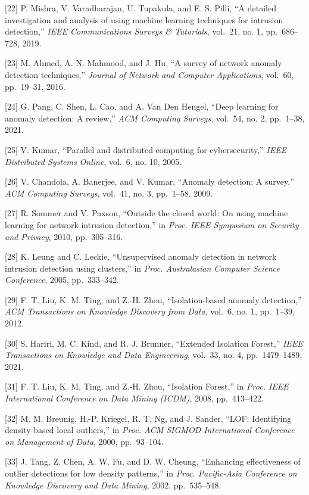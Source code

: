 \documentclass[
  a4paper]{report}
\begin{document}
{[}22{]} P. Mishra, V. Varadharajan, U. Tupakula, and E. S. Pilli, ``A
detailed investigation and analysis of using machine learning techniques
for intrusion detection,'' \emph{IEEE Communications Surveys \&
Tutorials}, vol.~21, no. 1, pp.~686--728, 2019.

{[}23{]} M. Ahmed, A. N. Mahmood, and J. Hu, ``A survey of network
anomaly detection techniques,'' \emph{Journal of Network and Computer
Applications}, vol.~60, pp.~19--31, 2016.

{[}24{]} G. Pang, C. Shen, L. Cao, and A. Van Den Hengel, ``Deep
learning for anomaly detection: A review,'' \emph{ACM Computing
Surveys}, vol.~54, no. 2, pp.~1--38, 2021.

{[}25{]} V. Kumar, ``Parallel and distributed computing for
cybersecurity,'' \emph{IEEE Distributed Systems Online}, vol.~6, no. 10,
2005.

{[}26{]} V. Chandola, A. Banerjee, and V. Kumar, ``Anomaly detection: A
survey,'' \emph{ACM Computing Surveys}, vol.~41, no. 3, pp.~1--58, 2009.

{[}27{]} R. Sommer and V. Paxson, ``Outside the closed world: On using
machine learning for network intrusion detection,'' in \emph{Proc. IEEE
Symposium on Security and Privacy}, 2010, pp.~305--316.

{[}28{]} K. Leung and C. Leckie, ``Unsupervised anomaly detection in
network intrusion detection using clusters,'' in \emph{Proc.
Australasian Computer Science Conference}, 2005, pp.~333--342.

{[}29{]} F. T. Liu, K. M. Ting, and Z.-H. Zhou, ``Isolation-based
anomaly detection,'' \emph{ACM Transactions on Knowledge Discovery from
Data}, vol.~6, no. 1, pp.~1--39, 2012.

{[}30{]} S. Hariri, M. C. Kind, and R. J. Brunner, ``Extended Isolation
Forest,'' \emph{IEEE Transactions on Knowledge and Data Engineering},
vol.~33, no. 4, pp.~1479--1489, 2021.

{[}31{]} F. T. Liu, K. M. Ting, and Z.-H. Zhou, ``Isolation Forest,'' in
\emph{Proc. IEEE International Conference on Data Mining (ICDM)}, 2008,
pp.~413--422.

{[}32{]} M. M. Breunig, H.-P. Kriegel, R. T. Ng, and J. Sander, ``LOF:
Identifying density-based local outliers,'' in \emph{Proc. ACM SIGMOD
International Conference on Management of Data}, 2000, pp.~93--104.

{[}33{]} J. Tang, Z. Chen, A. W. Fu, and D. W. Cheung, ``Enhancing
effectiveness of outlier detections for low density patterns,'' in
\emph{Proc. Pacific-Asia Conference on Knowledge Discovery and Data
Mining}, 2002, pp.~535--548.
\end{document}
